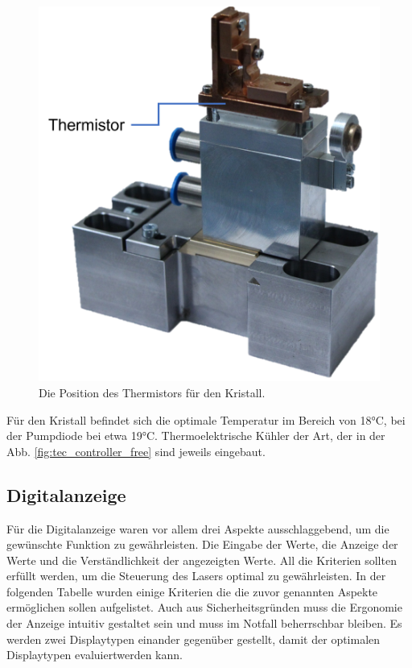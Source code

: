 \begin{figure}[H]
    \centering
    \includegraphics[scale=0.5, trim=0mm 70mm 0mm 0mm, clip]{98_images/thermistor_cr.png}
    \caption{Die Position des Thermistors für den Kristall.}
    \label{fig:thermistor_cr}
\end{figure}

Für den Kristall befindet sich die optimale Temperatur im Bereich von 18°C, bei der Pumpdiode bei etwa 19°C. Thermoelektrische Kühler der Art, der in der Abb. \ref{fig:tec_controller_free} sind jeweils eingebaut.

\subsection{Digitalanzeige}
Für die Digitalanzeige waren vor allem drei Aspekte ausschlaggebend, um die gewünschte Funktion zu gewährleisten. Die Eingabe der Werte, die Anzeige der Werte und die Verständlichkeit der angezeigten Werte. All die Kriterien sollten erfüllt werden, um die Steuerung des Lasers optimal zu gewährleisten. In der folgenden Tabelle wurden einige Kriterien die die zuvor genannten Aspekte ermöglichen sollen aufgelistet. Auch aus Sicherheitsgründen muss die Ergonomie der Anzeige intuitiv gestaltet sein und muss im Notfall beherrschbar bleiben. Es werden zwei Displaytypen einander gegenüber gestellt, damit der optimalen Displaytypen evaluiertwerden kann.

